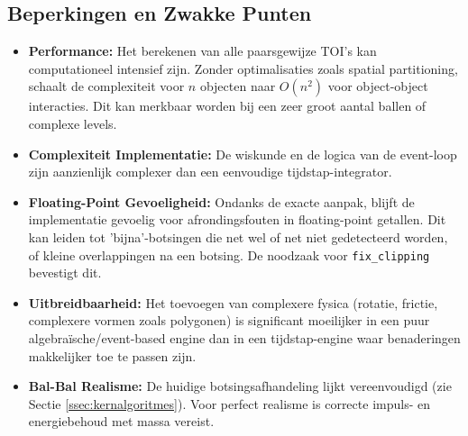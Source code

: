 \documentclass[11pt, a4paper]{article}
\begin{document}
\subsection{Beperkingen en Zwakke Punten}
\begin{itemize}
    \item \textbf{Performance:} Het berekenen van alle paarsgewijze TOI's kan computationeel intensief zijn. Zonder optimalisaties zoals spatial partitioning, schaalt de complexiteit voor $n$ objecten naar $O(n^2)$ voor object-object interacties. Dit kan merkbaar worden bij een zeer groot aantal ballen of complexe levels.
    \item \textbf{Complexiteit Implementatie:} De wiskunde en de logica van de event-loop zijn aanzienlijk complexer dan een eenvoudige tijdstap-integrator.
    \item \textbf{Floating-Point Gevoeligheid:} Ondanks de exacte aanpak, blijft de implementatie gevoelig voor afrondingsfouten in floating-point getallen. Dit kan leiden tot 'bijna'-botsingen die net wel of net niet gedetecteerd worden, of kleine overlappingen na een botsing. De noodzaak voor \texttt{fix\_clipping} bevestigt dit.
    \item \textbf{Uitbreidbaarheid:} Het toevoegen van complexere fysica (rotatie, frictie, complexere vormen zoals polygonen) is significant moeilijker in een puur algebraïsche/event-based engine dan in een tijdstap-engine waar benaderingen makkelijker toe te passen zijn.
    \item \textbf{Bal-Bal Realisme:} De huidige botsingsafhandeling lijkt vereenvoudigd (zie Sectie \ref{ssec:kernalgoritmes}). Voor perfect realisme is correcte impuls- en energiebehoud met massa vereist.
\end{itemize}
\end{document}
